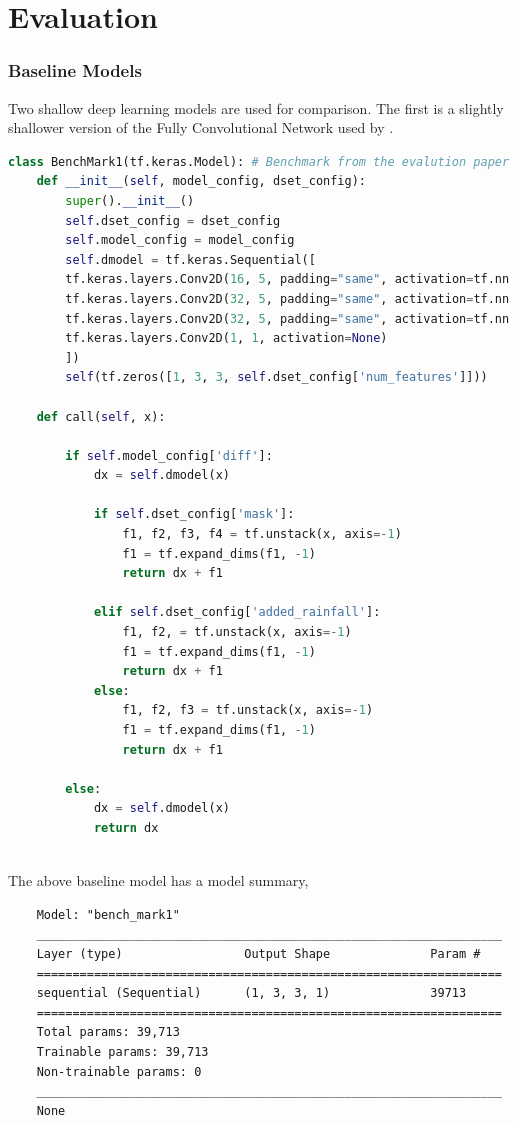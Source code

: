 \section{Evaluation}

\subsubsection*{Baseline Models}
Two shallow deep learning models are used for comparison. The first is a slightly shallower version of the Fully Convolutional Network used by \citeauthor{russo2023evaluation}.

\begin{lstlisting}[language=Python, label={lst:6}]
class BenchMark1(tf.keras.Model): # Benchmark from the evalution paper (but reduced, do to computational constraints)
	def __init__(self, model_config, dset_config):
		super().__init__()
		self.dset_config = dset_config
		self.model_config = model_config
		self.dmodel = tf.keras.Sequential([
		tf.keras.layers.Conv2D(16, 5, padding="same", activation=tf.nn.relu),
		tf.keras.layers.Conv2D(32, 5, padding="same", activation=tf.nn.relu),
		tf.keras.layers.Conv2D(32, 5, padding="same", activation=tf.nn.relu),
		tf.keras.layers.Conv2D(1, 1, activation=None)
		])
		self(tf.zeros([1, 3, 3, self.dset_config['num_features']]))

	def call(self, x):
	
		if self.model_config['diff']:
			dx = self.dmodel(x)
			
			if self.dset_config['mask']:
				f1, f2, f3, f4 = tf.unstack(x, axis=-1)
				f1 = tf.expand_dims(f1, -1)
				return dx + f1
			
			elif self.dset_config['added_rainfall']:
				f1, f2, = tf.unstack(x, axis=-1)
				f1 = tf.expand_dims(f1, -1)
				return dx + f1
			else:
				f1, f2, f3 = tf.unstack(x, axis=-1)
				f1 = tf.expand_dims(f1, -1)
				return dx + f1
		
		else:
			dx = self.dmodel(x)
			return dx
	
\end{lstlisting}
The above baseline model has a model summary,
\begin{verbatim}
	Model: "bench_mark1"
	_________________________________________________________________
	Layer (type)                 Output Shape              Param #   
	=================================================================
	sequential (Sequential)      (1, 3, 3, 1)              39713     
	=================================================================
	Total params: 39,713
	Trainable params: 39,713
	Non-trainable params: 0
	_________________________________________________________________
	None
\end{verbatim}

